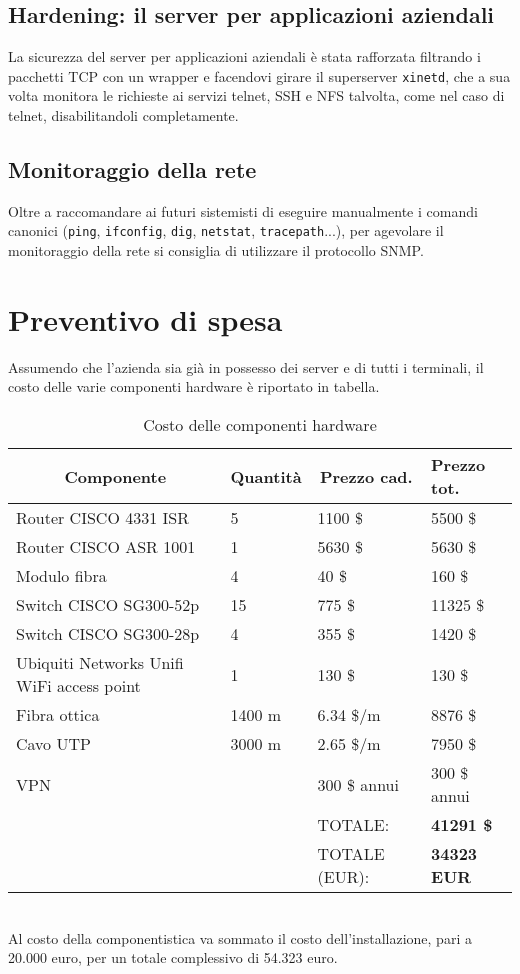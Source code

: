 \documentclass[a4paper,11pt]{article}
\def\code#1{\texttt{#1}}
\begin{document}
\subsection{Hardening: il server per applicazioni aziendali}
La sicurezza del server per applicazioni aziendali è stata rafforzata filtrando i pacchetti TCP con un wrapper e facendovi girare il superserver \code{xinetd}, che a sua volta monitora le richieste ai servizi telnet, SSH e NFS talvolta, come nel caso di telnet, disabilitandoli completamente.
\subsection{Monitoraggio della rete}
Oltre a raccomandare ai futuri sistemisti di eseguire manualmente i comandi canonici (\code{ping}, \code{ifconfig}, \code{dig}, \code{netstat}, \code{tracepath}...), per agevolare il monitoraggio della rete si consiglia di utilizzare il protocollo SNMP.
\newpage
\section{Preventivo di spesa}
Assumendo che l'azienda sia già in possesso dei server e di tutti i terminali, il costo delle varie componenti hardware è riportato in tabella.
\begin{table}[H]
\centering
\label{costo componentistica}
\begin{tabular}{ll|l|l|}
\hline
\multicolumn{1}{|c|}{\textbf{Componente}} & \multicolumn{1}{c|}{\textbf{Quantità}} & \multicolumn{1}{c|}{\textbf{Prezzo cad.}} & \textbf{Prezzo tot.} \\ \hline
\multicolumn{1}{|l|}{Router CISCO 4331 ISR} & 5 & 1100 \$ & 5500 \$ \\ \hline
\multicolumn{1}{|l|}{Router CISCO ASR 1001} & 1 & 5630 \$ & 5630 \$ \\ \hline
\multicolumn{1}{|l|}{Modulo fibra} & 4 & 40 \$ & 160 \$ \\ \hline
\multicolumn{1}{|l|}{Switch CISCO SG300-52p} & 15 & 775 \$ & 11325 \$ \\ \hline
\multicolumn{1}{|l|}{Switch CISCO SG300-28p} & 4 & 355 \$ & 1420 \$ \\ \hline
\multicolumn{1}{|l|}{Ubiquiti Networks Unifi WiFi access point} & 1 & 130 \$ & 130 \$ \\ \hline
\multicolumn{1}{|l|}{Fibra ottica} & 1400 m & 6.34 \$/m & 8876 \$ \\ \hline
\multicolumn{1}{|l|}{Cavo UTP} & 3000 m & 2.65 \$/m & 7950 \$ \\ \hline
\multicolumn{1}{|l|}{VPN} &  & 300 \$ annui & 300 \$ annui \\ \hline
 &  & TOTALE: & \textbf{41291 \$} \\ \cline{3-4} 
 &  & TOTALE (EUR): & \textbf{34323 EUR} \\ \cline{3-4} 
\end{tabular}
\caption{Costo delle componenti hardware}
\end{table}
\ \\Al costo della componentistica va sommato il costo dell'installazione, pari a 20.000 euro, per un totale complessivo di 54.323 euro.
\end{document}
